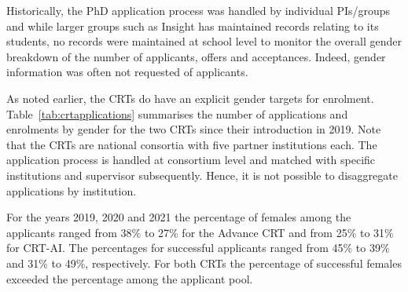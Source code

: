 Historically, the PhD application process was handled by individual 
PIs/groups and while larger groups such as Insight has maintained
records relating to its students, no records were maintained at 
school level to monitor the overall gender breakdown of the number 
of applicants, offers and acceptances. Indeed, gender information was
often not requested of applicants. 

As noted earlier, the CRTs do have an explicit gender targets for enrolment.
Table~\ref{tab:crtapplications} summarises the
number of applications and enrolments by gender for the two CRTs
since their introduction in 2019. Note that the CRTs are national
consortia with five partner institutions each. The application
process is handled at consortium level and matched with specific
institutions and supervisor subsequently. Hence, it is not possible
to disaggregate applications by institution.




For the years 2019, 2020 and 2021 the percentage 
of females among the applicants ranged from  38\% to 27\% for the 
Advance CRT and from 25\% to 31\% for CRT-AI. The percentages for 
successful applicants ranged from 45\% to 39\% and 31\% to 49\%, 
respectively. For both CRTs the percentage of successful
females exceeded the percentage among the applicant pool.








